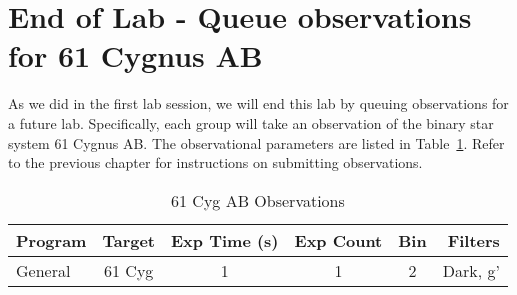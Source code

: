 \section{End of Lab - Queue observations for 61 Cygnus AB}

As we did in the first lab session, we will end this lab by queuing observations for a future lab. Specifically, each group will take an observation of the binary star system 61 Cygnus AB. The observational parameters are listed in Table~\ref{61Cyg_obs}. Refer to the previous chapter for instructions on submitting observations.

\begin{table}
	\centering
	\caption{61 Cyg AB Observations}
	\label{61Cyg_obs}
	\begin{tabular}{|l|c|c|c|c|r|}
		\hline
		\textbf{Program} & \textbf{Target} & \textbf{Exp Time (s)} & \textbf{Exp Count} & \textbf{Bin}
		& \textbf{Filters} \\
		\hline
		General & 61 Cyg & 1 & 1 & 2 & Dark, g' \\
		\hline
	\end{tabular}
\end{table}